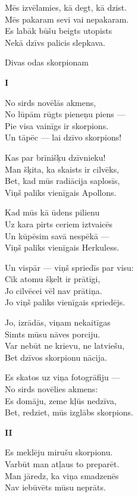 \documentclass[14pt]{extarticle}
\begin{document}
Mēs izvēlamies, kā degt, kā dzist.\\
Mēs pakaram sevi vai nepakaram.\\
Es labāk būšu beigts utopists\\
Nekā dzīvs palicis slepkava.


\newpage

{\large \sc Divas odas skorpionam}

{\bf I}

No sirds novēlās akmens,\\
No lūpām rūgts pieneņu piens ---\\
Pie visa vainīgs ir skorpions.\\
Un tāpēc --- lai dzīvo skorpions!

Kas par brīnišķu dzīvnieku!\\
Man šķita, ka skaists ir cilvēks,\\
Bet, kad mūs radiācija saplosīs,\\
Viņš paliks vienīgais Apollons.

Kad mūs kā ūdens pilienu\\
Uz kara pirts ceriem iztvaicēs\\
Un kūpēsim savā nespēkā ---\\
Viņš paliks vienīgais Herkuless.

Un vispār --- viņš spriedīs par visu:\\
Cik atomu šķelt ir prātīgi,\\
Jo cilvēcei vēl nav prātiņa.\\
Jo viņš paliks vienīgais spriedējs.

Jo, izrādās, viņam nekaitīgas\\
Simts mūsu nāves porciju.\\
Var nebūt ne krievu, ne latviešu,\\
Bet dzīvos skorpionu nācija.

Es skatos uz viņa fotogrāfiju ---\\
No sirds novēlies akmens:\\
Es domāju, zeme kļūs nedzīva,\\
Bet, redziet, mūs izglābs skorpions.


\newpage

{\bf II}

Es meklēju mirušu skorpionu.\\
Varbūt man atļaus to preparēt.\\
Man jāredz, ka viņa smadzenēs\\
Nav iebūvēts mūsu neprāts.
\end{document}
